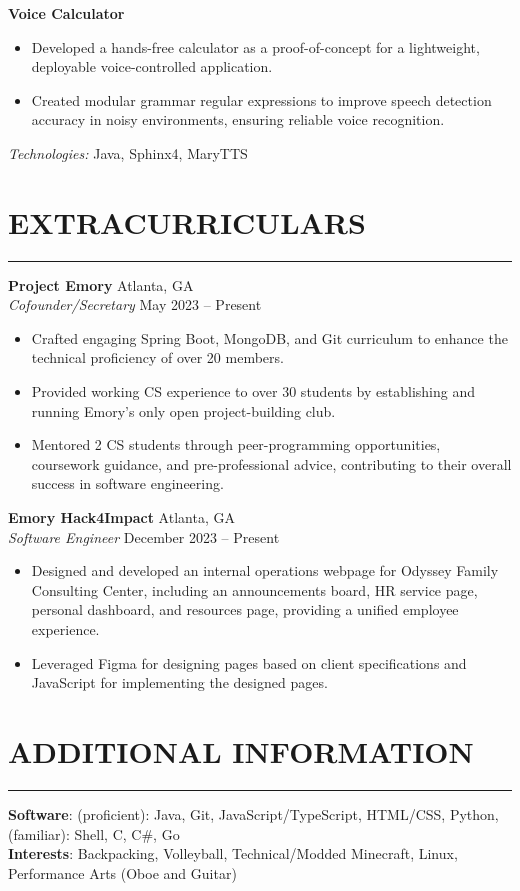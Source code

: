 \documentclass[10.5pt]{article}
\begin{document}
\noindent
\textbf{Voice Calculator}
\begin{itemize}
    \item Developed a hands-free calculator as a proof-of-concept for a lightweight, deployable voice-controlled application. \item Created modular grammar regular expressions to improve speech detection accuracy in noisy environments, ensuring reliable voice recognition.
\end{itemize}
\emph{Technologies:} {Java, Sphinx4, MaryTTS}

 \vspace{-\baselineskip}
\section*{\large\textbf{EXTRACURRICULARS}}
\vspace{-\baselineskip}
\noindent\rule{\textwidth}{0.4pt}


\noindent
\textbf{Project Emory} \hfill {Atlanta, GA} \\
\emph{Cofounder/Secretary} \hfill {May 2023} -- {Present}
\begin{itemize}
    \item Crafted engaging Spring Boot, MongoDB, and Git curriculum to enhance the technical proficiency of over 20 members. \item Provided working CS experience to over 30 students by establishing and running Emory's only open project-building club. \item Mentored 2 CS students through peer-programming opportunities, coursework guidance, and pre-professional advice, contributing to their overall success in software engineering.
\end{itemize}

\noindent
\textbf{Emory Hack4Impact} \hfill {Atlanta, GA} \\
\emph{Software Engineer} \hfill {December 2023} -- {Present}
\begin{itemize}
    \item Designed and developed an internal operations webpage for Odyssey Family Consulting Center, including an announcements board, HR service page, personal dashboard, and resources page, providing a unified employee experience. \item Leveraged Figma for designing pages based on client specifications and JavaScript for implementing the designed pages.
\end{itemize}

 \vspace{-\baselineskip}
\section*{\large\textbf{ADDITIONAL INFORMATION}}
\vspace{-\baselineskip}
\noindent\rule{\textwidth}{0.4pt}

\noindent
\textbf{Software}: (proficient): Java, Git, JavaScript/TypeScript, HTML/CSS, Python, (familiar): Shell, C, C\#, Go\\ 
\noindent
\textbf{Interests}: Backpacking, Volleyball, Technical/Modded Minecraft, Linux, Performance Arts (Oboe and Guitar)\\ 
\end{document}
